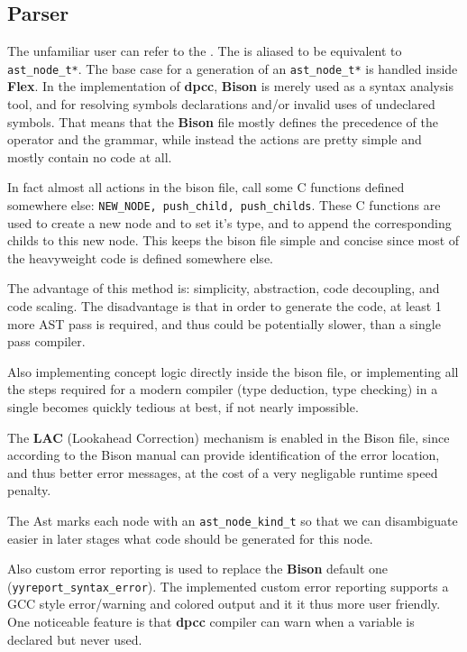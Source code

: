\documentclass[a4paper]{article}
\newcommand{\urlref}[3][blue]{\href{#2}{\color{#1}{#3}}}%
\begin{document}
\subsection{Parser}
The unfamiliar user can refer to the \urlref{https://www.gnu.org/software/bison/manual/bison.html}{Bison manual}.
The  is aliased to be equivalent to \texttt{ast\_node\_t*}. The base case for a generation of an
\texttt{ast\_node\_t*} is handled inside \textbf{Flex}. In the implementation of \textbf{dpcc}, \textbf{Bison}
is merely used as a syntax analysis tool, and for resolving symbols declarations and/or invalid uses of undeclared symbols.
That means that the \textbf{Bison} file mostly defines the precedence of the operator and the grammar, while instead
the actions are pretty simple and mostly contain no code at all.

In fact almost all actions in the bison file, call some C functions defined somewhere else: \texttt{NEW\_NODE, push\_child, push\_childs}.
These C functions are used to create a new node and to set it's type, and to append the corresponding childs to this new node.
This keeps the bison file simple and concise since most of the heavyweight code is defined somewhere else.

The advantage of this method is: simplicity, abstraction, code decoupling, and code scaling. The disadvantage is that in order
to generate the code, at least 1 more AST pass is required, and thus could be potentially slower, than a single
pass compiler.

Also implementing concept logic directly inside the bison file, or implementing all the steps required for a modern
compiler (type deduction, type checking) in a single becomes quickly tedious at best, if not nearly impossible.

The \textbf{LAC} (Lookahead Correction) mechanism is enabled in the Bison file, since according to the Bison manual can provide
identification of the error location, and thus better error messages, at the cost of a very negligable runtime speed penalty.

The Ast marks each node with an \texttt{ast\_node\_kind\_t} so that we can disambiguate easier in later
stages what code should be generated for this node.

Also custom error reporting is used to replace the \textbf{Bison} default one (\texttt{yyreport\_syntax\_error}). The implemented custom error reporting
supports a GCC style error/warning and colored output and it it thus more user friendly.
One noticeable feature is that \textbf{dpcc} compiler can warn when a variable is declared but never used.
\end{document}
